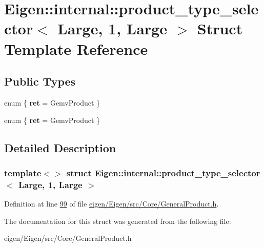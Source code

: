 \hypertarget{struct_eigen_1_1internal_1_1product__type__selector_3_01_large_00_011_00_01_large_01_4}{}\section{Eigen\+:\+:internal\+:\+:product\+\_\+type\+\_\+selector$<$ Large, 1, Large $>$ Struct Template Reference}
\label{struct_eigen_1_1internal_1_1product__type__selector_3_01_large_00_011_00_01_large_01_4}
\subsection*{Public Types}
\begin{DoxyCompactItemize}
\item 
\mbox{\label{struct_eigen_1_1internal_1_1product__type__selector_3_01_large_00_011_00_01_large_01_4_a7d30b995d65cd4041256ef6f35daf032}} 
enum \{ {\bfseries ret} = Gemv\+Product
 \}
\item 
\mbox{\label{struct_eigen_1_1internal_1_1product__type__selector_3_01_large_00_011_00_01_large_01_4_a379160d499bcc7ad134c6e1e08d966bc}} 
enum \{ {\bfseries ret} = Gemv\+Product
 \}
\end{DoxyCompactItemize}


\subsection{Detailed Description}
\subsubsection*{template$<$$>$\newline
struct Eigen\+::internal\+::product\+\_\+type\+\_\+selector$<$ Large, 1, Large $>$}



Definition at line \hyperlink{eigen_2_eigen_2src_2_core_2_general_product_8h_source_l00099}{99} of file \hyperlink{eigen_2_eigen_2src_2_core_2_general_product_8h_source}{eigen/\+Eigen/src/\+Core/\+General\+Product.\+h}.



The documentation for this struct was generated from the following file\+:\begin{DoxyCompactItemize}
\item 
eigen/\+Eigen/src/\+Core/\+General\+Product.\+h\end{DoxyCompactItemize}

